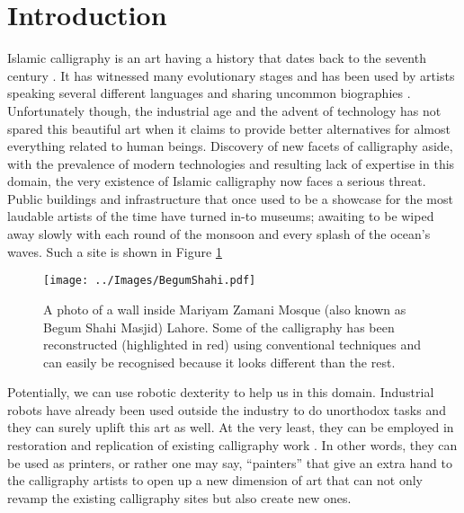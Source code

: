 \section{Introduction}
\label{Chapter:Introduction}
{
    Islamic calligraphy is an art having a history that dates back to the seventh century \cite{bib01, bib02}. It has witnessed many evolutionary stages \cite{bib02, bib03} and has been used by artists speaking several different languages \cite{bib04} and sharing uncommon biographies \cite{bib05,bib06,bib07,bib08}. Unfortunately though, the industrial age and the advent of technology has not spared this beautiful art when it claims to provide better alternatives for almost everything related to human beings. Discovery of new facets of calligraphy aside, with the prevalence of modern technologies and resulting lack of expertise in this domain, the very existence of Islamic calligraphy now faces a serious threat. Public buildings and infrastructure that once used to be a showcase for the most laudable artists of the time have turned in-to museums; awaiting to be wiped away slowly with each round of the monsoon and every splash of the ocean’s waves. Such a site is shown in Figure \ref{Fig:BegumShahi}

    \begin{figure}[!t]
        \centering
        \texttt{[image: ../Images/BegumShahi.pdf]}
        \caption{A photo of a wall inside Mariyam Zamani Mosque (also known as Begum Shahi Masjid) Lahore. Some of the calligraphy has been reconstructed (highlighted in red) using conventional techniques and can easily be recognised because it looks different than the rest.}
        \label{Fig:BegumShahi}
    \end{figure}
%
%


    Potentially, we can use robotic dexterity to help us in this domain. Industrial robots have already been used outside the industry to do unorthodox tasks \cite{bib09, bib10,bib11,bib12} and they can surely uplift this art as well. At the very least, they can be employed in restoration and replication of existing calligraphy work \cite{bib13}. In other words, they can be used as printers, or rather one may say, “painters” that give an extra hand to the calligraphy artists to open up a new dimension of art that can not only revamp the existing calligraphy sites but also create new ones.

}
